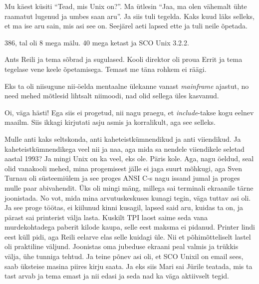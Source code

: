 Mu käest küsiti \enquote{Tead, mis Unix on?}. Ma ütlesin \enquote{Jaa, ma olen 
vähemalt ühte raamatut lugenud ja umbes saan aru}. Ja siis tuli tegelda. Kaks 
kuud läks selleks, et ma ise aru sain, mis asi see on. Seejärel aeti lapsed 
ette ja tuli neile õpetada.


386, tal oli 8 mega mälu. 40 mega ketast ja SCO Unix 3.2.2. 


Ants Reili ja tema sõbrad ja sugulased. Kooli direktor 
oli proua Errit ja tema tegelase vene keele 
õpetamisega. Temast me täna rohkem ei räägi. 

Eks  ta oli niisugune nii-öelda mentaalne ülekanne vanast \emph{mainframe} 
ajastut, no need mehed mõtlesid lihtsalt niimoodi, nad olid sellega üles 
kasvanud. 


Oi, väga hästi! Ega siis ei progetud, nii nagu praegu, et \emph{include}-takse 
kogu eelnev maailm. Siis ikkagi kirjutati asju asmis ja korralikult, aga see 
selleks. 

Mulle anti kaks seltskonda, anti kaheteistkümnendikud ja anti viiendikud. Ja 
kaheteistkümnendikega veel nii ja naa, aga mida sa nendele viiendikele seletad 
aastal 1993? Ja  mingi Unix on ka veel, eks ole. Päris kole. Aga, nagu öeldud, 
seal olid vanakooli mehed, mina progemisest jälle ei jaga suurt mõhkugi, aga 
Sven Turnau oli  süsteemiülem ja see proges ANSI C-s 
nagu issand jumal ja proges mulle paar abivahendit. Üks oli mingi mäng, millega 
sai terminali ekraanile tärne joonistada. No vot, mida mina arvutuskeskuses 
kunagi tegin, väga tuttav asi oli. Ja see proge töötas, ei kiilunud kinni 
kusagil, lapsed said aru, kuidas ta on, ja pärast sai printerist välja lasta. 
Kuskilt TPI laost saime seda vana murdekohtadega paberit kilode kaupa, selle 
eest maksma ei pidanud. Printer lindi eest küll pidi, aga Reili eelarve elas 
selle kuidagi  üle. Nii et põhimõtteliselt lastel oli praktiline väljund. 
Joonistas oma jubeduse  ekraani peal valmis ja trükkis välja, ühe tunniga 
tehtud. Ja teine põnev asi oli, et SCO Unixil on email 
sees, saab üksteise masina piires kirju saata. Ja eks siis Mari sai Jürile 
teatada, mis ta tast arvab ja tema emast ja nii edasi ja seda nad ka väga 
aktiivselt tegid. 

